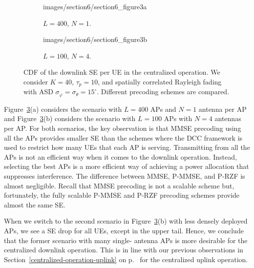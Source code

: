 \begin{figure}[p!]
	\begin{subfigure}[b]{\columnwidth} \centering 
		\begin{overpic}[width=0.88\columnwidth,tics=10]{images/section6/section6_figure3a}
		\end{overpic} \label{figureSec6_1a}
		\caption{$L=400$, $N=1$.} 
		\vspace{4mm}
	\end{subfigure} 
	\begin{subfigure}[b]{\columnwidth} \centering 
		\begin{overpic}[width=0.88\columnwidth,tics=10]{images/section6/section6_figure3b}
		\end{overpic} \label{figureSec6_1b}
		\caption{$L=100$, $N=4$.} 
	\end{subfigure} 
	\caption{ CDF of the downlink SE per UE in the centralized operation. We consider $K=40$, $\tau_p=10$, and spatially correlated Rayleigh  fading with ASD $\sigma_{\varphi}=\sigma_{\theta}=15^{\circ}$. Different precoding schemes are compared.}\label{figureSec6_1}
\end{figure}

Figure~\ref{figureSec6_1}(a) considers the scenario with $L=400$ APs and $N=1$ antenna per AP and Figure~\ref{figureSec6_1}(b) considers the scenario with $L=100$ APs with $N=4$ antennas per AP. For both scenarios, the key observation is that MMSE precoding using all the APs provides smaller SE than the schemes  where the DCC framework is used to restrict how many UEs that each AP is serving. Transmitting from all the APs is not an efficient way when it comes to the downlink operation. Instead, selecting the best APs is a more efficient way of achieving a power allocation that suppresses interference. 
The difference between MMSE, P-MMSE, and P-RZF is almost negligible.
Recall that MMSE precoding is not a scalable scheme but, fortunately, the fully scalable P-MMSE and P-RZF precoding schemes provide almost the same SE. 

When we switch to the second scenario in Figure~\ref{figureSec6_1}(b) with less densely deployed APs, we see a SE drop for all UEs, except in the upper tail. Hence, we conclude that the former scenario with many single- antenna APs is more desirable for the centralized downlink operation. This is in line with our previous observations in Section~\ref{centralized-operation-uplink} on p.~\pageref{centralized-operation-uplink} for the centralized uplink operation.


